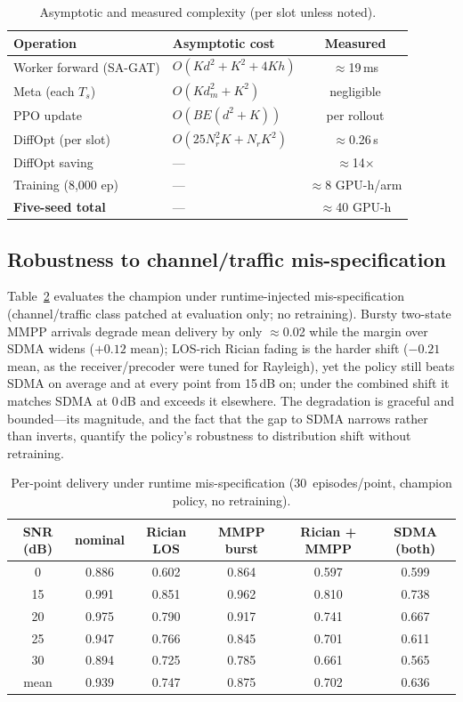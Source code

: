 \documentclass[journal]{IEEEtran}
\begin{document}
\begin{table}[t]
\centering
\footnotesize
\setlength{\tabcolsep}{3pt}
\caption{Asymptotic and measured complexity (per slot unless noted).}
\label{tab:complex}
\begin{tabular}{l|l|c}
\toprule
Operation & Asymptotic cost & Measured \\
\midrule
Worker forward (SA-GAT) & $O(Kd^2{+}K^2{+}4Kh)$ & $\approx$19\,ms \\
Meta (each $T_s$) & $O(Kd_m^2{+}K^2)$ & negligible \\
PPO update & $O(BE(d^2{+}K))$ & per rollout \\
DiffOpt (per slot) & $O(25N_r^2 K{+}N_r K^2)$ & $\approx$0.26\,s \\
DiffOpt saving & --- & $\approx$14$\times$ \\
Training (8{,}000 ep) & --- & $\approx$8 GPU-h/arm \\
\textbf{Five-seed total} & --- & $\approx$40 GPU-h \\
\bottomrule
\end{tabular}
\end{table}

\subsection{Robustness to channel/traffic mis-specification}
Table~\ref{tab:mismatch} evaluates the champion under runtime-injected
mis-specification (channel/traffic class patched at evaluation only; no
retraining). Bursty two-state MMPP arrivals degrade mean delivery by only
$\approx$0.02 while the margin over SDMA widens ($+0.12$ mean); LOS-rich Rician
fading is the harder shift ($-0.21$ mean, as the receiver/precoder were tuned for
Rayleigh), yet the policy still beats SDMA on average and at every point from
15\,dB on; under the combined shift it matches SDMA at 0\,dB and exceeds it
elsewhere. The degradation is graceful and bounded---its magnitude, and the fact
that the gap to SDMA narrows rather than inverts, quantify the policy's
robustness to distribution shift without retraining.

\begin{table}[t]
\centering
\small
\caption{Per-point delivery under runtime mis-specification (30~episodes/point,
  champion policy, no retraining).}
\label{tab:mismatch}
\begin{tabular}{c|c|c|c|c|c}
\toprule
SNR (dB) & nominal & Rician LOS & MMPP burst & Rician + MMPP & SDMA (both) \\
\midrule
0  & 0.886 & 0.602 & 0.864 & 0.597 & 0.599 \\
15 & 0.991 & 0.851 & 0.962 & 0.810 & 0.738 \\
20 & 0.975 & 0.790 & 0.917 & 0.741 & 0.667 \\
25 & 0.947 & 0.766 & 0.845 & 0.701 & 0.611 \\
30 & 0.894 & 0.725 & 0.785 & 0.661 & 0.565 \\
\midrule
mean & 0.939 & 0.747 & 0.875 & 0.702 & 0.636 \\
\bottomrule
\end{tabular}
\end{table}
\end{document}
